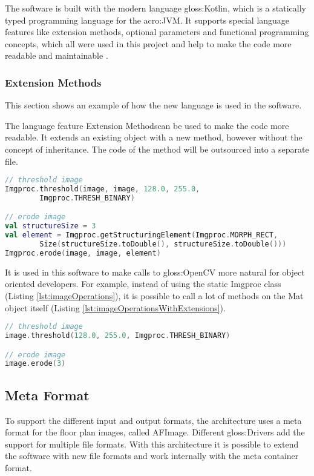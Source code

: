 The software is built with the modern language \gls{gloss:Kotlin}, which is a statically typed programming language for the \acrfull{acro:JVM}. It supports special language features like extension methods, optional parameters and functional programming concepts, which all were used in this project and help to make the code more readable and maintainable \citep{kotlin}.

\subsubsection{Extension Methods}
This section shows an example of how the new language is used in the software.

The language feature \flqq Extension Methods\frqq  can be used to make the code more readable. It extends an existing object with a new method, however without the concept of inheritance. The code of the method will be outsourced into a separate file.

\begin{lstlisting}[caption={Erode image without extension methods},label={lst:imageOperations},language=Kotlin]
// threshold image
Imgproc.threshold(image, image, 128.0, 255.0, 
		Imgproc.THRESH_BINARY)

// erode image
val structureSize = 3
val element = Imgproc.getStructuringElement(Imgproc.MORPH_RECT, 
        Size(structureSize.toDouble(), structureSize.toDouble()))
Imgproc.erode(image, image, element)
\end{lstlisting}

It is used in this software to make calls to \gls{gloss:OpenCV} more natural for object oriented developers. For example, instead of using the static Imgproc class (Listing \ref{lst:imageOperations}), it is possible to call a lot of methods on the Mat object itself (Listing \ref{lst:imageOperationsWithExtensions}).

\begin{lstlisting}[caption={Erode image with extension methods},label={lst:imageOperationsWithExtensions},language=Kotlin]
// threshold image
image.threshold(128.0, 255.0, Imgproc.THRESH_BINARY)

// erode image
image.erode(3)
\end{lstlisting}

\pagebreak

\subsection{Meta Format}
\label{sub:MetaFormat}
To support the different input and output formats, the architecture uses a meta format for the
floor plan images, called AFImage. Different \gls{gloss:Drivers} add the support for multiple file formats. With this architecture it is possible to extend the software with new file formats and work internally with the meta container format.


